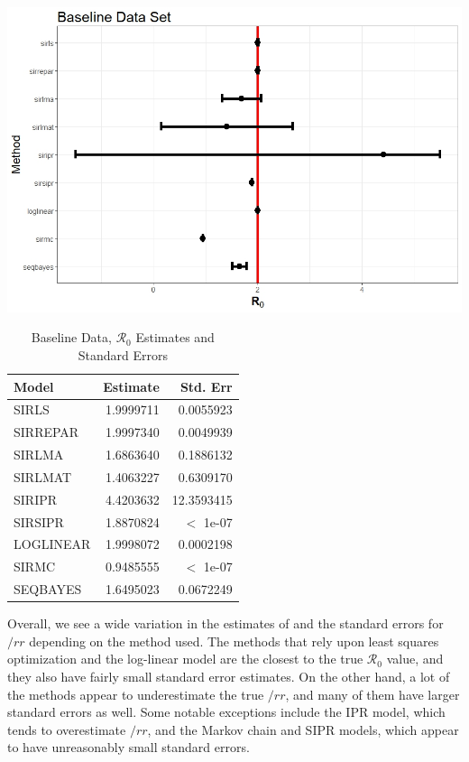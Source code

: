 \documentclass[12pt]{article}
\newcommand{\rr}{\ensuremath{\mathcal{R}_0}}
\begin{document}
\begin{table}[H]
	\includegraphics[scale=0.5]{BaseBase.jpeg}
	
	\caption{\label{tab:}Baseline Data, $\rr$ Estimates and Standard Errors}
	\centering
	\begin{tabular}[t]{l|r|r}
		\hline
		Model & Estimate & Std. Err\\
		\hline
		SIRLS & 1.9999711 & 0.0055923\\
		\hline
		SIRREPAR & 1.9997340 & 0.0049939\\
		\hline
		SIRLMA & 1.6863640 & 0.1886132\\
		\hline
		SIRLMAT & 1.4063227 & 0.6309170\\
		\hline
		SIRIPR & 4.4203632 & 12.3593415\\
		\hline
		SIRSIPR & 1.8870824 & $<$ 1e-07 \\
		\hline
		LOGLINEAR & 1.9998072 & 0.0002198\\
		\hline
		SIRMC & 0.9485555 &  $<$ 1e-07 \\
		\hline
		SEQBAYES & 1.6495023 & 0.0672249\\
		\hline
	\end{tabular}
\end{table}

Overall, we see a wide variation in the estimates of and the standard errors for $/rr$ depending on the method used. The methods that rely upon least squares optimization and the log-linear model are the closest to the true $\rr$ value, and they also have fairly small standard error estimates. On the other hand, a lot of the methods appear to underestimate the true $/rr$, and many of them have larger standard errors as well. Some notable exceptions include the IPR model, which tends to overestimate $/rr$, and the Markov chain and SIPR models, which appear to have unreasonably small standard errors.
\end{document}
